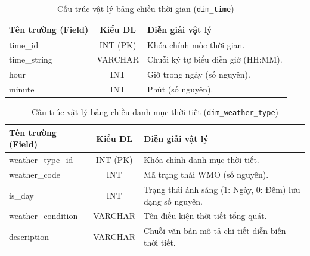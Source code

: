 \documentclass[12pt, a4paper]{report}
\begin{document}
\begin{table}[H]
\centering
\caption{Cấu trúc vật lý bảng chiều thời gian (\texttt{dim\_time})}
\label{tab:dim_time}
\renewcommand{\arraystretch}{1.4}
\begin{tabularx}{\textwidth}{p{4.5cm} c X}
\toprule
\textbf{Tên trường (Field)} & \textbf{Kiểu DL} & \textbf{Diễn giải vật lý} \\
\midrule
time\_id     & INT (PK) & Khóa chính mốc thời gian. \\
time\_string & VARCHAR  & Chuỗi ký tự biểu diễn giờ (HH:MM). \\
hour         & INT      & Giờ trong ngày (số nguyên). \\
minute       & INT      & Phút (số nguyên). \\
\bottomrule
\end{tabularx}
\end{table}

\begin{table}[H]
\centering
\caption{Cấu trúc vật lý bảng chiều danh mục thời tiết (\texttt{dim\_weather\_type})}
\label{tab:dim_weather_type}
\renewcommand{\arraystretch}{1.4}
\begin{tabularx}{\textwidth}{p{4.5cm} c X}
\toprule
\textbf{Tên trường (Field)} & \textbf{Kiểu DL} & \textbf{Diễn giải vật lý} \\
\midrule
weather\_type\_id    & INT (PK) & Khóa chính danh mục thời tiết. \\
weather\_code       & INT      & Mã trạng thái WMO (số nguyên). \\
is\_day             & INT      & Trạng thái ánh sáng (1: Ngày, 0: Đêm) lưu dạng số nguyên. \\
weather\_condition  & VARCHAR  & Tên điều kiện thời tiết tổng quát. \\
description         & VARCHAR  & Chuỗi văn bản mô tả chi tiết diễn biến thời tiết. \\
\bottomrule
\end{tabularx}
\end{table}
\end{document}
